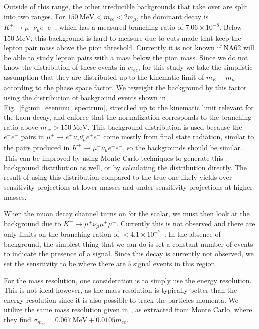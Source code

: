 Outside of this range, the other irreducible backgrounds that take over are split into two ranges.
For $150~\textrm{MeV} < m_{ee} < 2m_\mu$, the dominant decay is $K^+ \rightarrow \mu^+ \nu_\mu e^+ e^-$, which has a measured branching ratio of $7.06 \times 10^{-8}$.
Below $150~\textrm{MeV}$, this background is hard to measure due to cuts made that keep the lepton pair mass above the pion threshold.
Currently it is not known if NA62 will be able to study lepton pairs with a mass below the pion mass.
Since we do not know the distribution of these events in $m_{ee}$, for this study we take the simplistic assumption that they are distributed up to the kinematic limit of $m_K - m_\mu$ according to the phase space factor.
We reweight the background by this factor using the distribution of background events shown in Fig.~\ref{fig:mu_eeenunu_spectrum}, stretched up to the kinematic limit relevant for the kaon decay, and enforce that the normalization corresponds to the branching ratio above $m_{ee} > 150~\textrm{MeV}$.
This background distribution is used because the $e^+ e^-$ pairs in $\mu^+ \rightarrow e^+ \nu_e \bar{\nu_\mu} e^+ e^-$ come mostly from final state radiation, similar to the pairs produced in $K^+ \rightarrow \mu^+ \nu_\mu e^+ e^-$, so the backgrounds should be similar.
This can be improved by using Monte Carlo techniques to generate this background distribution as well, or by calculating the distribution directly.
The result of using this distribution compared to the true one likely yields over-sensitivity projections at lower masses and under-sensitivity projections at higher masses.

When the muon decay channel turns on for the scalar, we must then look at the background due to $K^+ \rightarrow \mu^+ \nu_\mu \mu^+ \mu^-$.
Currently this is not observed and there are only limits on the branching ration of $< 4.1 \times 10^{-7}$~\cite{Agashe:2014kda}.
In the absence of background, the simplest thing that we can do is set a constant number of events to indicate the presence of a signal.
Since this decay is currently not observed, we set the sensitivity to be where there are 5 signal events in this region.

For the mass resolution, one consideration is to simply use the energy resolution.
This is not ideal however, as the mass resolution is typically better than the energy resolution since it is also possible to track the particles momenta.
We utilize the same mass resolution given in~\cite{Batley:2015lha}, as extracted from Monte Carlo, where they find $\sigma_{m_{ee}} = 0.067~\textrm{MeV} + 0.0105 m_{ee}$.

